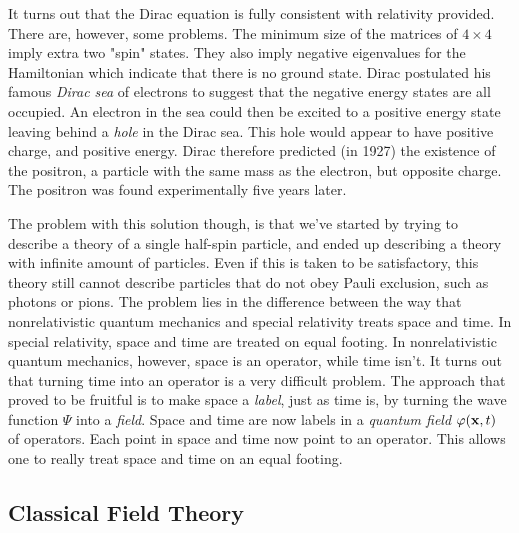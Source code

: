 It turns out that the Dirac equation is fully consistent with relativity provided. There are, however, some problems. The minimum size of the matrices of $4\times 4$ imply extra two "spin" states. They also imply negative eigenvalues for the Hamiltonian which indicate that there is no ground state. Dirac postulated his famous \emph{Dirac sea} of electrons to suggest that the negative energy states are all occupied. An electron in the sea could then be excited to a positive energy state leaving behind a \emph{hole} in the Dirac sea. This hole would appear to have positive charge, and positive energy. Dirac therefore predicted (in 1927) the existence of the positron, a particle with the same mass as the electron, but opposite charge. The positron was found experimentally five years later.

The problem with this solution though, is that we've started by trying to describe a theory of a single half-spin particle, and ended up describing a theory with infinite amount of particles. Even if this is taken to be satisfactory, this theory still cannot describe particles that do not obey Pauli exclusion, such as photons or pions. The problem lies in the difference between the way that nonrelativistic quantum mechanics and special relativity treats space and time. In special relativity, space and time are treated on equal footing. In nonrelativistic quantum mechanics, however, space is an operator, while time isn't. It turns out that turning time into an operator is a very difficult problem. The approach that proved to be fruitful is to make space a \emph{label}, just as time is, by turning the wave function $\Psi$ into a \emph{field}. Space and time are now labels in a \emph{quantum field} $\varphi(\vb{x},t)$ of operators. Each point in space and time now point to an operator. This allows one to really treat space and time on an equal footing.

\subsection{Classical Field Theory}
\label{sec:classical-field}

